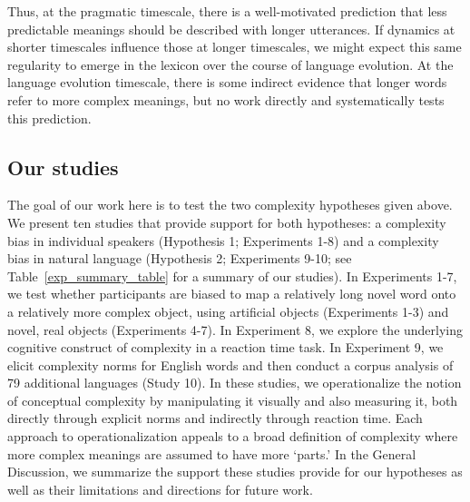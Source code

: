 Thus, at the pragmatic timescale, there is a well-motivated prediction that less predictable meanings should be described with longer utterances. If dynamics at shorter timescales influence those at longer timescales, we might expect this same regularity to emerge in the lexicon over the course of language evolution. At the language evolution timescale, there is some indirect evidence that longer words refer to more complex meanings, but no work directly and systematically tests this prediction.

\subsection{Our studies}

The goal of our work here is to test the two complexity hypotheses given above. We present ten studies that provide support for both hypotheses: a complexity bias in individual speakers (Hypothesis 1; Experiments 1-8) and a complexity bias in natural language (Hypothesis 2; Experiments 9-10; see Table~\ref{exp_summary_table} for a summary of our studies). In Experiments 1-7, we test whether participants are biased to map a relatively long novel word onto a relatively more complex object, using artificial objects (Experiments 1-3) and novel, real objects (Experiments 4-7). In Experiment 8, we explore the underlying cognitive construct of complexity in a reaction time task. In Experiment 9, we elicit complexity norms for English words and then conduct a corpus analysis of 79 additional languages (Study 10). In these studies, we operationalize the notion of conceptual complexity by manipulating it visually and also measuring it, both directly through explicit norms and indirectly through reaction time. Each approach to operationalization appeals to a broad definition of complexity where more complex meanings are assumed to have more `parts.' In the General Discussion, we  summarize the support these studies provide for our hypotheses as well as their limitations and directions for future work.

